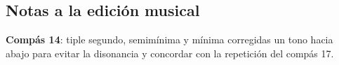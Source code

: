\subsection*{Notas a la edición musical}

\noindent \textbf{Compás 14}: tiple segundo, semimínima y mínima corregidas un tono hacia abajo para evitar la disonancia y concordar con la repetición del compás 17. 
